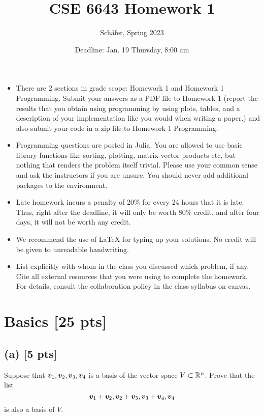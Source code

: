 \documentclass[twoside,10pt]{article}
\begin{document}
\title{CSE 6643 Homework 1}
\author{Sch{\"a}fer, Spring 2023}
\date{Deadline: Jan. 19 Thursday, 8:00 am}
\maketitle

\begin{itemize}
  \item There are 2 sections in grade scope: Homework 1 and Homework 1 Programming. Submit your answers as a PDF file to Homework 1 (report the results that you obtain using programming by using plots, tables, and a description of your implementation like you would when writing a paper.) and also submit your code in a zip file to Homework 1 Programming. 
  \item Programming questions are posted in Julia. You are allowed to use basic library functions like sorting, plotting, matrix-vector products etc, but nothing that renders the problem itself trivial. Please use your common sense and ask the instructors if you are unsure. 
  You should never add additional packages to the environment.
  \item Late homework incurs a penalty of 20\% for every 24 hours that it is late. Thus, right after the deadline, it will only be worth 80\% credit, and after four days, it will not be worth any credit. 
  \item We recommend the use of LaTeX for typing up your solutions. No credit will be given to unreadable handwriting.
  \item List explicitly with whom in the class you discussed which problem, if any. Cite all external resources that you were using to complete the homework. For details, consult the collaboration policy in the class syllabus on canvas.
\end{itemize}

\section{Basics [25 pts]}

\subsection*{(a) [5 pts]}
Suppose that $\bm{v}_1, \bm{v}_2, \bm{v}_3, \bm{v}_4$ is a basis of the vector space $V \subset \mathbb{R}^n$. Prove that the list 
\begin{equation}
  \bm{v}_1 + \bm{v}_2, \bm{v}_2 + \bm{v}_3, \bm{v}_3 + \bm{v}_4, \bm{v}_4
\end{equation}
is also a basis of $V$.
\end{document}
